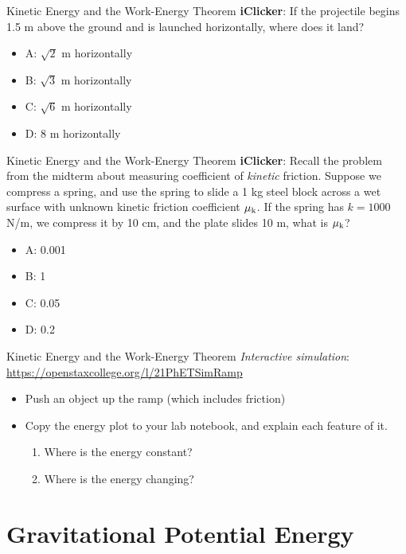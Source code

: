 \documentclass{beamer}
\begin{document}
\begin{frame}{Kinetic Energy and the Work-Energy Theorem}
\textbf{iClicker}: If the projectile begins 1.5 m above the ground and is launched horizontally, where does it land?
\begin{itemize}
\item A: $\sqrt{2}$ m horizontally
\item B: $\sqrt{3}$ m horizontally
\item C: $\sqrt{6}$ m horizontally
\item D: 8 m horizontally 
\end{itemize}
\end{frame}

\begin{frame}{Kinetic Energy and the Work-Energy Theorem}
\textbf{iClicker}: Recall the problem from the midterm about measuring coefficient of \textit{kinetic} friction.  Suppose we compress a spring, and use the spring to slide a 1 kg steel block across a wet surface with unknown kinetic friction coefficient $\mu_{\rm k}$.  If the spring has $k=1000$ N/m, we compress it by 10 cm, and the plate slides 10 m, what is $\mu_{\rm k}$?
\begin{itemize}
\item A: 0.001
\item B: 1
\item C: 0.05
\item D: 0.2 
\end{itemize}
\end{frame}

\begin{frame}{Kinetic Energy and the Work-Energy Theorem}
\textit{Interactive simulation}:
\url{https://openstaxcollege.org/l/21PhETSimRamp}
\begin{itemize}
\item Push an object up the ramp (which includes friction)
\item Copy the energy plot to your lab notebook, and explain each feature of it.
\begin{enumerate}
\item Where is the energy constant?
\item Where is the energy changing?
\end{enumerate}
\end{itemize}
\end{frame}

\section{Gravitational Potential Energy}
\end{document}
